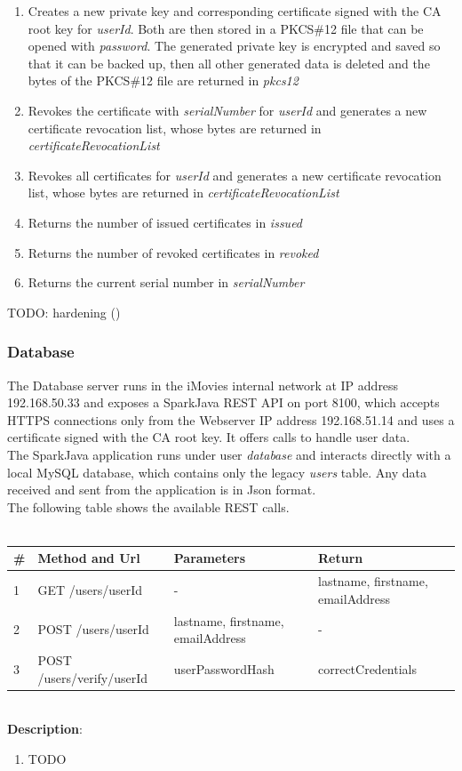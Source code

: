 \documentclass[english]{article}
\begin{document}
\begin{enumerate}
\item Creates a new private key and corresponding certificate signed with the CA root key for \emph{userId}. Both are then stored in a PKCS\#12 file that can be opened with \emph{password}. The generated private key is encrypted and saved so that it can be backed up, then all other generated data is deleted and the bytes of the PKCS\#12 file are returned in \emph{pkcs12}
\item Revokes the certificate with \emph{serialNumber} for \emph{userId} and generates a new certificate revocation list, whose bytes are returned in \emph{certificateRevocationList}
\item Revokes all certificates for \emph{userId} and generates a new certificate revocation list, whose bytes are returned in \emph{certificateRevocationList}
\item Returns the number of issued certificates in \emph{issued}
\item Returns the number of revoked certificates in \emph{revoked}
\item Returns the current serial number in \emph{serialNumber}
\end{enumerate}

TODO: hardening ()

\subsubsection{Database}
The Database server runs in the iMovies internal network at IP address 192.168.50.33 and exposes a SparkJava REST API on port 8100, which accepts HTTPS connections only from the Webserver IP address 192.168.51.14 and uses a certificate signed with the CA root key. It offers calls to handle user data.\\
The SparkJava application runs under user \emph{database} and interacts directly with a local MySQL database, which contains only the legacy \emph{users} table. Any data received and sent from the application is in Json format.\\
The following table shows the available REST calls.\\
\\
\begin{tabular} {| p{} | p{} | p{} | p{} |}
\hline
\textbf{\#} & \textbf{Method and Url} & \textbf{Parameters} & \textbf{Return}\\
\hline
1 & GET /users/userId & - & lastname, firstname, emailAddress\\
\hline
2 & POST /users/userId & lastname, firstname, emailAddress & -\\
\hline
3 & POST /users/verify/userId & userPasswordHash & correctCredentials\\
\hline
\end{tabular}
\\
\textbf{Description}:
\begin{enumerate}
\item TODO
\end{enumerate}
\end{document}
